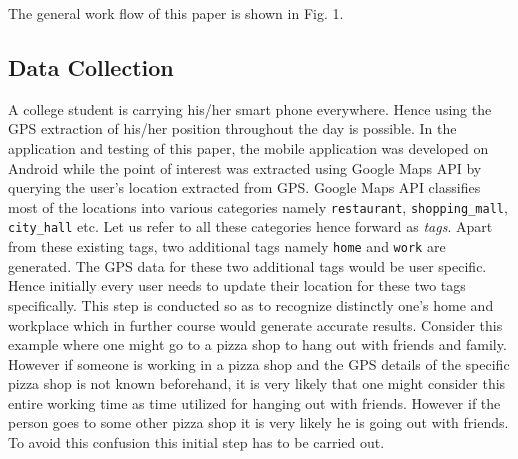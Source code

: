 \documentclass[conference]{IEEEtran}
\begin{document}
The general work flow of this paper is shown in Fig. 1.

\subsection{Data Collection}

A college student is carrying his/her smart phone everywhere. Hence using the GPS extraction of his/her position throughout the day is possible. In the application and testing of this paper, the mobile application was developed on Android \cite{android} while the point of interest was extracted using Google Maps API by querying the user\rq s location extracted from GPS. Google Maps API classifies most of the locations into various categories namely \texttt{restaurant}, \texttt{shopping\_mall}, \texttt{city\_hall} etc. Let us refer to all these categories hence forward as \textit{tags}. Apart from these existing tags, two additional tags namely \texttt{home} and \texttt{work} are generated. The GPS data for these two additional tags would be user specific. Hence initially every user needs to update their location for these two tags specifically. This step is conducted so as to recognize distinctly one\rq s home and workplace which in further course would generate accurate results. Consider this example where one might go to a pizza shop to hang out with friends and family. However if someone is working in a pizza shop and the GPS details of the specific pizza shop is not known beforehand, it is very likely that one might consider this entire working time as time utilized for hanging out with friends. However if the person goes to some other pizza shop it is very likely he is going out with friends. To avoid this confusion this initial step has to be carried out.
\end{document}
